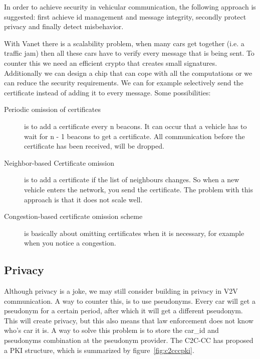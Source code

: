 \documentclass{article}
\begin{document}
In order to achieve security in vehicular communication, the following approach is suggested: first achieve id management and message integrity, secondly protect privacy and finally detect misbehavior.

With Vanet there is a scalability problem, when many cars get together (i.e. a traffic jam) then all these cars have to verify every message that is being sent. To counter this we need an efficient crypto that creates small signatures. Additionally we can design a chip that can cope with all the computations or we can reduce the security requirements. We can for example selectively send the certificate instead of adding it to every message. Some possibilities:

\begin{description}
\item[Periodic omission of certificates] is to add a certificate every n beacons. It can occur that a vehicle has to wait for n - 1 beacons to get a certificate. All communication before the certificate has been received, will be dropped.
\item[Neighbor-based Certificate omission] is to add a certificate if the list of neighbours changes. So when a new vehicle enters the network, you send the certificate. The problem with this approach is that it does not scale well.
\item[Congestion-based certificate omission scheme] is basically about omitting certificates when it is necessary, for example when you notice a congestion.
\end{description}

\subsection*{Privacy}

Although privacy is a joke, we may still consider building in privacy in V2V communication. A way to counter this, is to use pseudonyms. Every car will get a pseudonym for a certain period, after which it will get a different pseudonym. This will create privacy, but this also means that law enforcement does not know who's car it is. A way to solve this problem is to store the car\_id and pseudonyms combination at the pseudonym provider. The C2C-CC has proposed a PKI structure, which is summarized by figure~\ref{fig:c2cccpki}.
\end{document}
